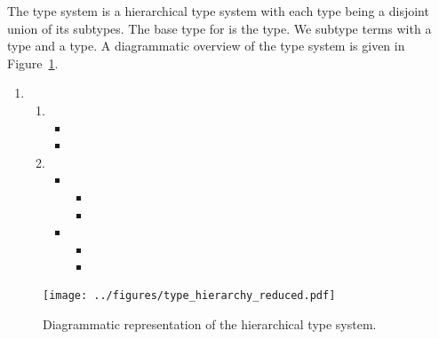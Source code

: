\begin{samepage}
\begin{definition}\label{def:type_system}
	The \dcproblogsty type system is a hierarchical type system with each type being a disjoint union of its subtypes.
	The base type for \dcproblogsty is the  type. We subtype terms with a  type and a  type. 
    A diagrammatic overview of the \dcproblogsty type system is given in Figure~\ref{fig:type_system}.
	\begin{enumerate}
		\item[]  
		\begin{enumerate}
			\item[1.] 
			\begin{itemize}
				\item {}
				\item {}
			\end{itemize}
			\item[2.] 
			\begin{itemize}		
				\item {}
				\begin{itemize}
				    \item {}
				    \item {}
				\end{itemize}
				\item {}
				\begin{itemize}
				    \item {}
				    \item {}
				\end{itemize}	
			\end{itemize}
		\end{enumerate}
	\end{enumerate}
\end{definition}
\end{samepage}



\begin{figure}[t]
	\begin{center}
		\texttt{[image: ../figures/type\_hierarchy\_reduced.pdf]}
	\end{center}
	\caption[Diagrammatic representation of the hierarchical \dcproblogsty type system.]{Diagrammatic representation of the hierarchical \dcproblogsty type system.}
	\label{fig:type_system}
\end{figure}




